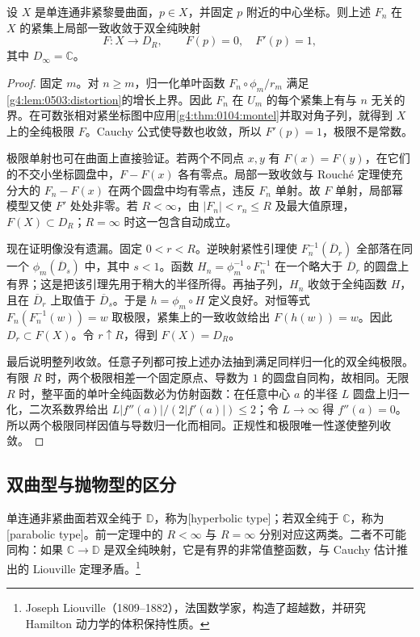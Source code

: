 \begin{theorem}
	\label{g4:thm:0503:noncompact-uniformization}
	设 \(X\) 是单连通非紧黎曼曲面，\(p\in X\)，并固定 \(p\) 附近的中心坐标。则上述 \(F_n\) 在 \(X\) 的紧集上局部一致收敛于双全纯映射
	\[
		F:X\longrightarrow D_R,
		\qquad F(p)=0,\quad F'(p)=1,
	\]
	其中 \(D_\infty=\mathbb C\)。
\end{theorem}
\begin{proof}
	固定 \(m\)。对 \(n\ge m\)，归一化单叶函数 \(F_n\circ\phi_m/r_m\) 满足\cref{g4:lem:0503:distortion}的增长上界。因此 \(F_n\) 在 \(U_m\) 的每个紧集上有与 \(n\) 无关的界。在可数张相对紧坐标图中应用\cref{g4:thm:0104:montel}并取对角子列，就得到 \(X\) 上的全纯极限 \(F\)。Cauchy 公式使导数也收敛，所以 \(F'(p)=1\)，极限不是常数。

	极限单射也可在曲面上直接验证。若两个不同点 \(x,y\) 有 \(F(x)=F(y)\)，在它们的不交小坐标圆盘中，\(F-F(x)\) 各有零点。局部一致收敛与 Rouché 定理使充分大的 \(F_n-F(x)\) 在两个圆盘中均有零点，违反 \(F_n\) 单射。故 \(F\) 单射，局部幂模型又使 \(F'\) 处处非零。若 \(R<\infty\)，由 \(|F_n|<r_n\le R\) 及最大值原理，\(F(X)\subset D_R\)；\(R=\infty\) 时这一包含自动成立。

	现在证明像没有遗漏。固定 \(0<r<R\)。逆映射紧性引理使 \(F_n^{-1}(\overline D_r)\) 全部落在同一个 \(\phi_m(\overline D_s)\) 中，其中 \(s<1\)。函数 \(H_n=\phi_m^{-1}\circ F_n^{-1}\) 在一个略大于 \(\overline D_r\) 的圆盘上有界；这是把该引理先用于稍大的半径所得。再抽子列，\(H_n\) 收敛于全纯函数 \(H\)，且在 \(\overline D_r\) 上取值于 \(\overline D_s\)。于是 \(h=\phi_m\circ H\) 定义良好。对恒等式 \(F_n(F_n^{-1}(w))=w\) 取极限，紧集上的一致收敛给出 \(F(h(w))=w\)。因此 \(D_r\subset F(X)\)。令 \(r\uparrow R\)，得到 \(F(X)=D_R\)。

	最后说明整列收敛。任意子列都可按上述办法抽到满足同样归一化的双全纯极限。有限 \(R\) 时，两个极限相差一个固定原点、导数为 \(1\) 的圆盘自同构，故相同。无限 \(R\) 时，整平面的单叶全纯函数必为仿射函数：在任意中心 \(a\) 的半径 \(L\) 圆盘上归一化，二次系数界给出 \(L|f''(a)|/(2|f'(a)|)\le2\)；令 \(L\to\infty\) 得 \(f''(a)=0\)。所以两个极限同样因值与导数归一化而相同。正规性和极限唯一性遂使整列收敛。
\end{proof}

\subsection{双曲型与抛物型的区分}
\label{g4:subsec:0503:04}

单连通非紧曲面若双全纯于 \(\mathbb D\)，称为[hyperbolic type]；若双全纯于 \(\mathbb C\)，称为[parabolic type]。前一定理中的 \(R<\infty\) 与 \(R=\infty\) 分别对应这两类。二者不可能同构：如果 \(\mathbb C\to\mathbb D\) 是双全纯映射，它是有界的非常值整函数，与 Cauchy 估计推出的 Liouville 定理矛盾。\footnote{Joseph Liouville（1809--1882），法国数学家，构造了超越数，并研究 Hamilton 动力学的体积保持性质。}

